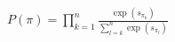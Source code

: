 \documentclass[preview]{standalone}
\begin{document}
\begin{align*}
P(\pi) = \prod_{k=1}^{n} \frac{\exp(s_{\pi_k})}{\sum_{l=k}^{n} \exp(s_{\pi_l})}
\end{align*}
\end{document}
